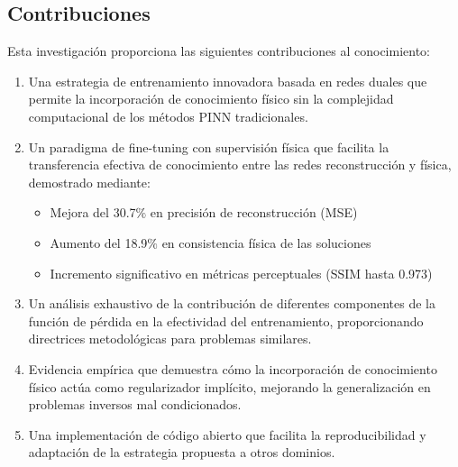 \subsection{Contribuciones}
\label{sec:intro_contributions}
Esta investigación proporciona las siguientes contribuciones al conocimiento:
\begin{enumerate}[start=1,label={C\arabic*:},wide = 0pt, leftmargin = 3em]
\item Una estrategia de entrenamiento innovadora basada en redes duales que permite la incorporación de conocimiento físico sin la complejidad computacional de los métodos PINN tradicionales.
\item Un paradigma de fine-tuning con supervisión física que facilita la transferencia efectiva de conocimiento entre las redes reconstrucción y física, demostrado mediante:
\begin{itemize}
\item Mejora del 30.7$\%$ en precisión de reconstrucción (MSE)
\item Aumento del 18.9$\%$ en consistencia física de las soluciones
\item Incremento significativo en métricas perceptuales (SSIM hasta 0.973)
\end{itemize}
\item Un análisis exhaustivo de la contribución de diferentes componentes de la función de pérdida en la efectividad del entrenamiento, proporcionando directrices metodológicas para problemas similares.
\item Evidencia empírica que demuestra cómo la incorporación de conocimiento físico actúa como regularizador implícito, mejorando la generalización en problemas inversos mal condicionados.
\item Una implementación de código abierto que facilita la reproducibilidad y adaptación de la estrategia propuesta a otros dominios.
\end{enumerate}
